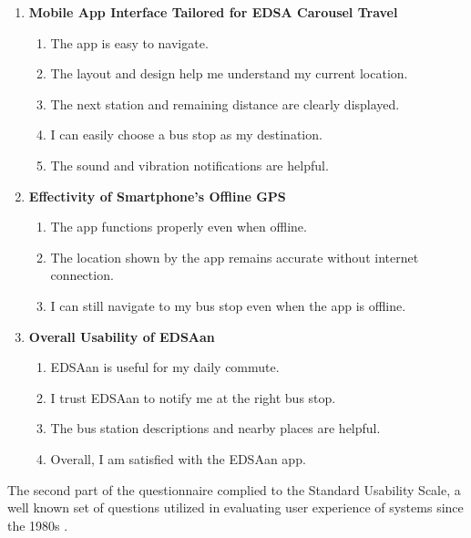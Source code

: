 \documentclass[journal]{./IEEE/IEEEtran}
\begin{document}
\begin{enumerate}

\item \textbf{Mobile App Interface Tailored for EDSA Carousel Travel}
    \begin{enumerate}
        \item The app is easy to navigate.
        \item The layout and design help me understand my current location.
        \item The next station and remaining distance are clearly displayed.
        \item I can easily choose a bus stop as my destination.
        \item The sound and vibration notifications are helpful.
    \end{enumerate}

\item \textbf{Effectivity of Smartphone’s Offline GPS}
    \begin{enumerate}
        \item The app functions properly even when offline.
        \item The location shown by the app remains accurate without internet connection.
        \item I can still navigate to my bus stop even when the app is offline.
    \end{enumerate}
\item \textbf{Overall Usability of EDSAan}
    \begin{enumerate}
        \item EDSAan is useful for my daily commute.
        \item I trust EDSAan to notify me at the right bus stop.
        \item The bus station descriptions and nearby places are helpful.
        \item Overall, I am satisfied with the EDSAan app.
    \end{enumerate}

\end{enumerate}

The second part of the questionnaire complied to the Standard Usability Scale, a well known set of questions utilized in evaluating user experience of systems since the 1980s \cite{Ref:010}.
\end{document}
